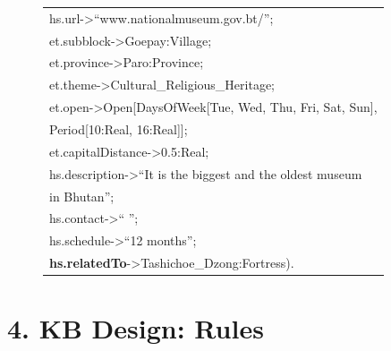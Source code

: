\documentclass[a4paper,9pt]{beamer}
\begin{document}
{\begin{figure} [tbph]
\begin{tabular}{|l|}
      \hspace{0.58in}   {\color{blue}hs.url}->``www.nationalmuseum.gov.bt/'';\\
      \hspace{0.58in}   {\color{blue}et.subblock}->Goepay:Village;\\
      \hspace{0.58in}   {\color{blue}et.province}->Paro:Province;\\
      \hspace{0.58in}   {\color{blue}et.theme}->Cultural\_Religious\_Heritage;\\
      \hspace{0.58in}   {\color{blue}et.open}->Open[DaysOfWeek[Tue, Wed, Thu, Fri, Sat, Sun],\\
       \hspace{1.45in}                            Period[10:Real, 16:Real]];\\
      \hspace{0.58in}   {\color{blue}et.capitalDistance}->0.5:Real;\\
      \hspace{0.58in}   {\color{blue}hs.description}->``It is the biggest and the oldest museum\\ 
      \hspace{1.55in}          in Bhutan'';\\
      \hspace{0.58in}   {\color{blue}hs.contact}->`` '';\\
      \hspace{0.58in}   {\color{blue}hs.schedule}->``12 months'';\\
      \hspace{0.58in}   {\color{blue}\large{\textbf{hs.relatedTo}}}->{\color{red}Tashichoe\_Dzong:Fortress}). \\ 
\hline
\end{tabular}
\end{figure}
}


\section{4. KB Design: Rules}
\end{document}
